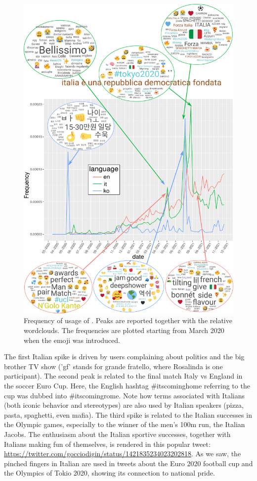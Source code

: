 \documentclass{article}
\begin{document}
\begin{figure}[hbtp]
\centering
  \includegraphics[width=1\linewidth]{Plots/freq_wordclouds-vertical.pdf}
\caption{Frequency of usage of . Peaks are reported together with the relative wordclouds. The frequencies are plotted starting from March 2020 when the emoji was introduced.}
\label{fig:freq_pinchedfingers}
\end{figure}

The first Italian spike is driven by users complaining about politics and the big brother TV show ('gf' stands for grande fratello, where Rosalinda is one participant). The second peak is related to the final match Italy vs England in the soccer Euro Cup. Here, the English hashtag \#itscominghome referring to the cup was dubbed into \#itscomingrome. Note how terms associated with Italians (both iconic behavior and stereotypes) are also used by Italian speakers (pizza, pasta, spaghetti, even mafia). The third spike is related to the Italian successes in the Olympic games, especially to the winner of the men's 100m run, the Italian Jacobs. The enthusiasm about the Italian sportive successes, together with Italians making fun of themselves, is rendered in this popular tweet: \url{https://twitter.com/gocciodigin/status/1421835234023202818}. As we saw, the pinched fingers in Italian are used in tweets about the Euro 2020 football cup and the Olympics of Tokio 2020, showing its connection to national pride.
\end{document}
